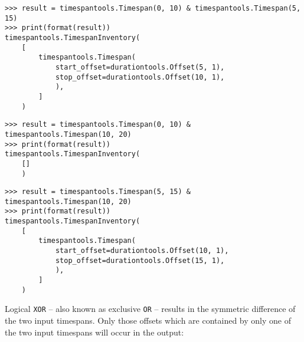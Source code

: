\begin{singlespacing}
\vspace{-0.5\baselineskip}
\begin{lstlisting}
>>> result = timespantools.Timespan(0, 10) & timespantools.Timespan(5, 15)
>>> print(format(result))
timespantools.TimespanInventory(
    [
        timespantools.Timespan(
            start_offset=durationtools.Offset(5, 1),
            stop_offset=durationtools.Offset(10, 1),
            ),
        ]
    )
\end{lstlisting}
\begin{lstlisting}
>>> result = timespantools.Timespan(0, 10) & timespantools.Timespan(10, 20)
>>> print(format(result))
timespantools.TimespanInventory(
    []
    )
\end{lstlisting}
\begin{lstlisting}
>>> result = timespantools.Timespan(5, 15) & timespantools.Timespan(10, 20)
>>> print(format(result))
timespantools.TimespanInventory(
    [
        timespantools.Timespan(
            start_offset=durationtools.Offset(10, 1),
            stop_offset=durationtools.Offset(15, 1),
            ),
        ]
    )
\end{lstlisting}
\end{singlespacing}

\noindent Logical \texttt{XOR} -- also known as exclusive \texttt{OR} --
results in the symmetric difference of the two input timespans. Only those
offsets which are contained by only one of the two input timespans will occur
in the output:

\begin{comment}
<abjad>
result = timespantools.Timespan(0, 10) ^ timespantools.Timespan(5, 15)
print(format(result))
result = timespantools.Timespan(0, 10) ^ timespantools.Timespan(10, 20)
print(format(result))
result = timespantools.Timespan(5, 15) ^ timespantools.Timespan(10, 20)
print(format(result))
</abjad>
\end{comment}

